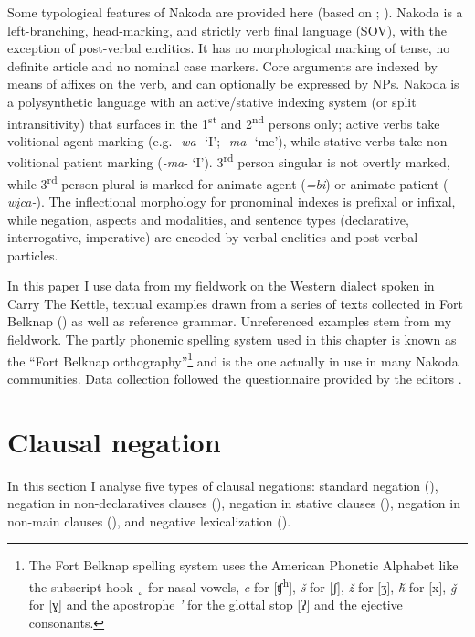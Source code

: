 \documentclass[output=paper,colorlinks,citecolor=brown]{langscibook}
\begin{document}
Some typological features of Nakoda are provided here (based on \citealt[viii–ix]{Cumberland2005}; \citealt[40]{Ullrich2018}).
Nakoda is a left-branching, head-marking, and strictly verb final language (SOV), with the exception of post-verbal enclitics. It has no morphological marking of tense, no definite article and no nominal case markers. Core arguments are indexed by means of affixes on the verb, and can optionally be expressed by NPs. Nakoda is a polysynthetic language with an active/stative indexing system (or split intransitivity) that surfaces in the 1\textsuperscript{st} and 2\textsuperscript{nd} persons only; active verbs take volitional agent marking (e.g. \textit{-wa-} ‘I’; \textit{-ma}- ‘me’), while stative verbs take non-volitional patient marking (\textit{-ma}- ‘I’). 3\textsuperscript{rd} person singular is not overtly marked, while 3\textsuperscript{rd} person plural is marked for animate agent (\textit{=bi}) or animate patient (\textit{-wįca-}). The inflectional morphology for pronominal indexes is prefixal or infixal, while negation, aspects and modalities, and sentence types (declarative, interrogative, imperative) are encoded by verbal enclitics and post-verbal particles. 

In this paper I use data from my fieldwork on the Western dialect spoken in Carry The Kettle, textual examples drawn from a series of texts collected in Fort Belknap (\citealt{ParksDeMallie2012a, ParksDeMallie2012b}) as well as  reference grammar. Unreferenced examples stem from my fieldwork. The partly phonemic spelling system used in this chapter is known as the “Fort Belknap orthography”\footnote{The Fort Belknap spelling system uses the American Phonetic Alphabet like the subscript hook \textit{˛} for nasal vowels, \textit{c} for [ʧ\textsuperscript{h}], \textit{š} for [ʃ], \textit{ž} for [ʒ], \textit{ȟ} for [x], \textit{ǧ} for [ɣ] and the apostrophe \textit{’} for the glottal stop [ʔ] and the ejective consonants.} and is the one actually in use in many Nakoda communities. Data collection followed the questionnaire provided  by the editors .

\section{Clausal negation}\label{sec:nak:2}

In this section I analyse five types of clausal negations: standard negation (), negation in non-declaratives clauses (), negation in stative clauses (), negation in non-main clauses (), and negative lexicalization ().
\end{document}
